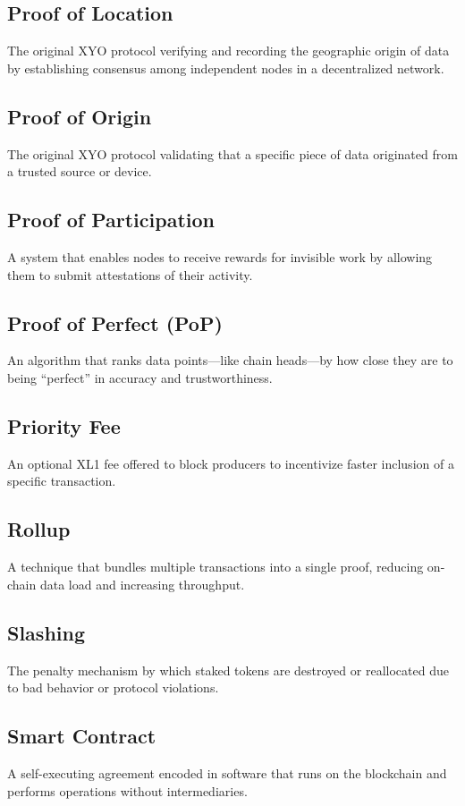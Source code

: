\documentclass{article}
\begin{document}
\subsection*{Proof of Location}
The original XYO protocol verifying and recording the geographic origin of data by establishing consensus among independent nodes in a decentralized network.

\subsection*{Proof of Origin}
The original XYO protocol validating that a specific piece of data originated from a trusted source or device.

\subsection*{Proof of Participation}
A system that enables nodes to receive rewards for invisible work by allowing them to submit attestations of their activity.

\subsection*{Proof of Perfect (PoP)}
An algorithm that ranks data points—like chain heads—by how close they are to being “perfect” in accuracy and trustworthiness.

\subsection*{Priority Fee}
An optional XL1 fee offered to block producers to incentivize faster inclusion of a specific transaction.

\subsection*{Rollup}
A technique that bundles multiple transactions into a single proof, reducing on-chain data load and increasing throughput.

\subsection*{Slashing}
The penalty mechanism by which staked tokens are destroyed or reallocated due to bad behavior or protocol violations.

\subsection*{Smart Contract}
A self-executing agreement encoded in software that runs on the blockchain and performs operations without intermediaries.
\end{document}
